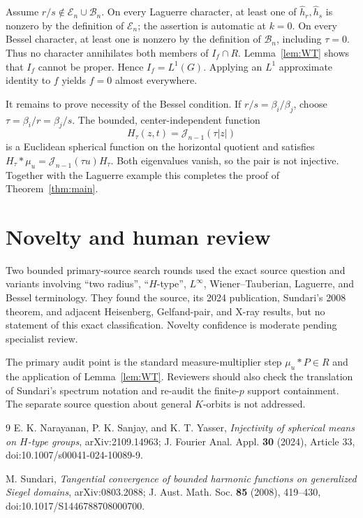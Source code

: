 \documentclass[11pt]{article}
\newcommand{\E}{\mathcal{E}}
\newcommand{\B}{\mathcal{B}}
\newcommand{\J}{\mathscr{J}}
\begin{document}
Assume $r/s\notin\E_n\cup\B_n$.  On every Laguerre character, at least
one of $\widehat h_r,\widehat h_s$ is nonzero by the definition of $\E_n$;
the assertion is automatic at $k=0$.  On every Bessel character, at least
one is nonzero by the definition of $\B_n$, including $\tau=0$.  Thus no
character annihilates both members of $I_f\cap R$.  Lemma~\ref{lem:WT}
shows that $I_f$ cannot be proper.  Hence $I_f=L^1(G)$.  Applying an
$L^1$ approximate identity to $f$ yields $f=0$ almost everywhere.

It remains to prove necessity of the Bessel condition.  If
$r/s=\beta_i/\beta_j$, choose
$\tau=\beta_i/r=\beta_j/s$.  The bounded, center-independent function
\[
 H_\tau(z,t)=\J_{n-1}(\tau|z|)
\]
is a Euclidean spherical function on the horizontal quotient and satisfies
$H_\tau*\mu_u=\J_{n-1}(\tau u)H_\tau$.  Both eigenvalues vanish, so the
pair is not injective.  Together with the Laguerre example this completes
the proof of Theorem~\ref{thm:main}.

\section{Novelty and human review}

Two bounded primary-source search rounds used the exact source question and
variants involving ``two radius'', ``$H$-type'', $L^\infty$,
Wiener--Tauberian, Laguerre, and Bessel terminology.  They found the source,
its 2024 publication, Sundari's 2008 theorem, and adjacent Heisenberg,
Gelfand-pair, and X-ray results, but no statement of this exact
classification.  Novelty confidence is moderate pending specialist review.

The primary audit point is the standard measure-multiplier step
$\mu_u*P\in R$ and the application of Lemma~\ref{lem:WT}.  Reviewers should
also check the translation of Sundari's spectrum notation and re-audit the
finite-$p$ support containment.  The separate source question about general
$K$-orbits is not addressed.

\begin{thebibliography}{9}
E. K. Narayanan, P. K. Sanjay, and K. T. Yasser,
\emph{Injectivity of spherical means on $H$-type groups},
arXiv:2109.14963; J. Fourier Anal. Appl. \textbf{30} (2024), Article 33,
doi:10.1007/s00041-024-10089-9.

M. Sundari,
\emph{Tangential convergence of bounded harmonic functions on generalized
Siegel domains}, arXiv:0803.2088; J. Aust. Math. Soc. \textbf{85} (2008),
419--430, doi:10.1017/S1446788708000700.
\end{thebibliography}
\end{document}
